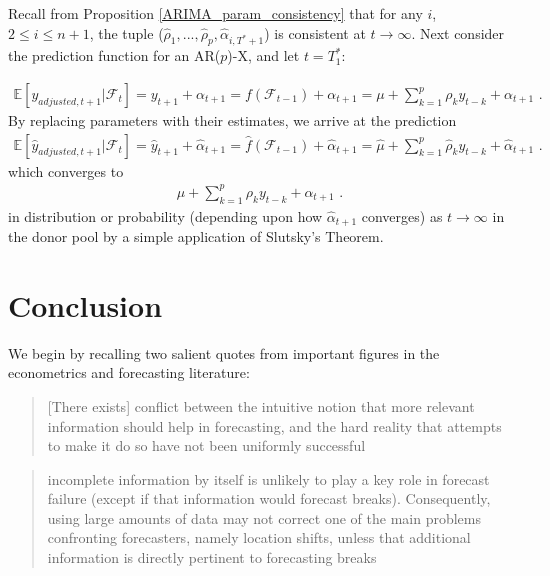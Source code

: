 \documentclass{uiucthesis2021}
\def\E{\mathbb{E}} %
\theoremstyle{definition}
\newenvironment{proof-of-proposition}[1][{}]{\noindent{\bf
    Proof of Proposition {#1}}
  \hspace*{.5em}}{\qed\bigskip\\}
\begin{document}
    \begin{proof-of-proposition}[\ref{ARIMA_conv_distribution}]
  
      Recall from Proposition \ref{ARIMA_param_consistency} that for any $i$, $2\leq i \leq n+1$, the tuple 
      ($\hat\rho_{1},...,\hat\rho_{p}, \hat\alpha_{i,T^{*}+1}$) is consistent at $t\rightarrow \infty$.  Next consider the prediction function for an AR($p$)-X, and let $t = T_{1}^{*}$:
  
      \begin{align*}
      \E[y_{adjusted,t+1}|\mathcal{F}_{t}] = y_{t+1} + \alpha_{t+1} = f(\mathcal{F}_{t-1}) + \alpha_{t+1} = \mu + \sum^{p}_{k=1}\rho_{k}y_{t-k} + \alpha_{t+1} \text{ .}
      \end{align*}
      By replacing parameters with their estimates, we arrive at the prediction 
      \begin{align*}
        \E[\hat{y}_{adjusted,t+1}|\mathcal{F}_{t}] = \hat{y}_{t+1} + \hat\alpha_{t+1} = \hat{f}(\mathcal{F}_{t-1}) + \hat\alpha_{t+1} = \hat\mu + \sum^{p}_{k=1}\hat\rho_{k}y_{t-k} + \hat{\alpha}_{t+1} \text{ .}
        \end{align*}
      which converges to 
      \begin{align*}
         \mu + \sum^{p}_{k=1}\rho_{k}y_{t-k} + \alpha_{t+1} \text{ .}
        \end{align*}
      in distribution or probability (depending upon how $\hat\alpha_{t+1}$ converges) as $t\rightarrow\infty$ in the donor pool by a simple application of Slutsky's Theorem.
      
      \end{proof-of-proposition}
      

\chapter{Conclusion}

We begin by recalling two salient quotes from important figures in the econometrics and forecasting literature:

\begin{quote}
  [There exists] conflict between the intuitive notion that more relevant information should help in forecasting, and the hard reality that attempts to make it do so have not been uniformly successful \parencite[][]{clements2005guest}
\end{quote}

\begin{quote}
incomplete information by itself is unlikely to play a key role in forecast failure (except if that information would forecast breaks). Consequently, using large amounts of data may not correct one of the main problems confronting forecasters, namely location shifts, unless that additional information is directly pertinent to forecasting breaks \parencite[][]{castle2013forecasting}
\end{quote}
\end{document}

